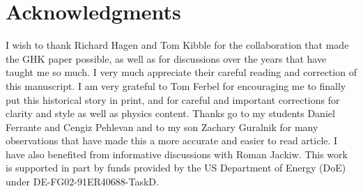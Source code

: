 \documentclass[12pt]{article}
\begin{document}
\section*{Acknowledgments}
I wish to thank Richard Hagen and Tom Kibble for the collaboration that made
the GHK paper possible, as well as for discussions over the years that have
taught me so much. I very much appreciate their careful reading and correction
of this manuscript. I am very grateful to Tom Ferbel for encouraging me to
finally put this historical story in print, and for careful and important
corrections for clarity and style as well as physics content. Thanks go to my
students Daniel Ferrante and Cengiz Pehlevan and to my son Zachary Guralnik
for many observations that have made this a more accurate and easier to read
article.  I have also benefited from informative discussions with Roman
Jackiw. This work is supported in part by funds provided by the US Department
of Energy (\textsf{DoE}) under \textsf{DE-FG02-91ER40688-TaskD}.
\end{document}
